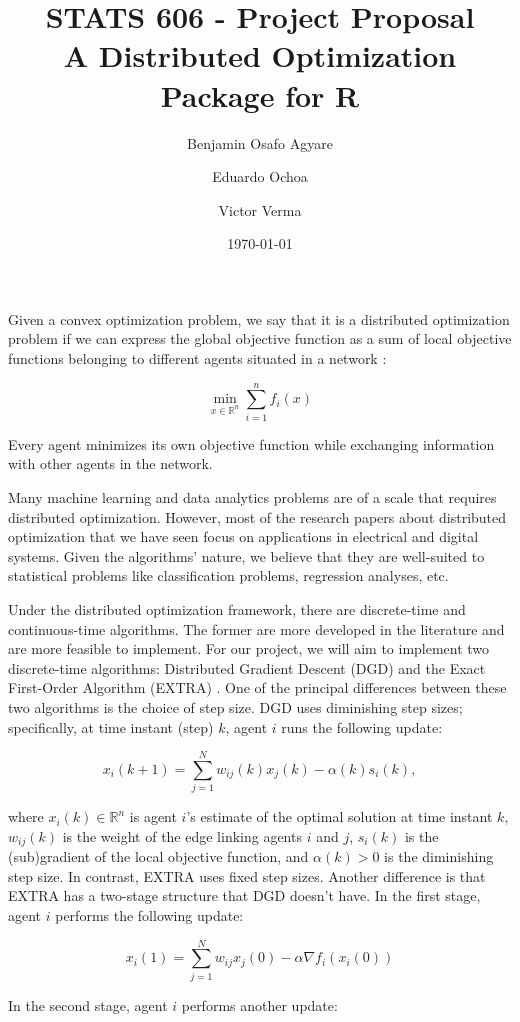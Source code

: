 \documentclass[11pt]{article}
\title{STATS 606 - Project Proposal \\ \large A Distributed Optimization Package for R}
\author{Benjamin Osafo Agyare \and Eduardo Ochoa \and Victor Verma}
\date{\today}
\begin{document}
\maketitle

Given a convex optimization problem, we say that it is a distributed optimization problem if we can express the global objective function as a sum of local objective functions belonging to different agents situated in a network \cite{Tao:2019}:
    
$$ \min_{x \in \mathbb{R}^n} \sum_{i=1}^n f_i(x)$$
    
Every agent minimizes its own objective function while exchanging information with other agents in the network.
    
Many machine learning and data analytics problems are of a scale that requires distributed optimization. However, most of the research papers about distributed optimization that we have seen focus on applications in electrical and digital systems. Given the algorithms' nature, we believe that they are well-suited to statistical problems like classification problems, regression analyses, etc.
    
Under the distributed optimization framework, there are discrete-time and continuous-time algorithms. The former are more developed in the literature and are more feasible to implement. For our project, we will aim to implement two discrete-time algorithms: Distributed Gradient Descent (DGD) \cite{Nedic:2009} and the Exact First-Order Algorithm (EXTRA) \cite{Wei:2015}. One of the principal differences between these two algorithms is the choice of step size. DGD uses diminishing step sizes; specifically, at time instant (step) $k$, agent $i$ runs the following update:
    
$$x_i(k+1) = \sum_{j=1}^N w_{ij}(k) x_j(k) - \alpha (k) s_i(k),$$
    
where $x_i(k) \in \mathbb{R}^n$ is agent $i$’s estimate of the optimal solution at time instant $k$, $w_{ij}(k)$ is the weight of the edge linking agents $i$ and $j$, $s_i(k)$ is the (sub)gradient of the local objective function, and $\alpha(k) > 0$ is the diminishing step size. In contrast, EXTRA uses fixed step sizes. Another difference is that EXTRA has a two-stage structure that DGD doesn't have. In the first stage, agent $i$ performs the following update:
    
$$x_i(1) = \sum_{j=1}^N w_{ij} x_j(0) - \alpha \nabla f_i (x_i(0))$$
    
In the second stage, agent $i$ performs another update:
    
\end{document}
